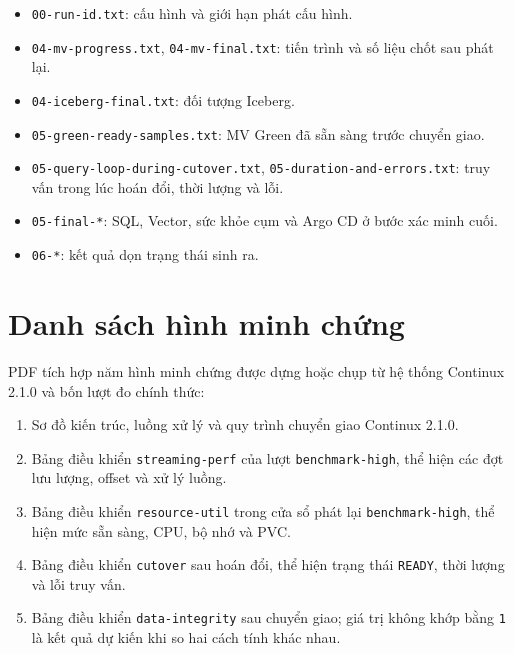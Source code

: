 \begin{itemize}
\item \texttt{00-run-id.txt}: cấu hình và giới hạn phát cấu hình.
\item \texttt{04-mv-progress.txt}, \texttt{04-mv-final.txt}: tiến trình và số liệu chốt sau phát lại.
\item \texttt{04-iceberg-final.txt}: đối tượng Iceberg.
\item \texttt{05-green-ready-samples.txt}: MV Green đã sẵn sàng trước chuyển giao.
\item \texttt{05-query-loop-during-cutover.txt}, \texttt{05-duration-and-errors.txt}: truy vấn trong lúc hoán đổi, thời lượng và lỗi.
\item \texttt{05-final-*}: SQL, Vector, sức khỏe cụm và Argo CD ở bước xác minh cuối.
\item \texttt{06-*}: kết quả dọn trạng thái sinh ra.
\end{itemize}

\section{Danh sách hình minh chứng}\label{app:figures}
PDF tích hợp năm hình minh chứng được dựng hoặc chụp từ hệ thống Continux 2.1.0 và bốn lượt đo chính thức:

\begin{enumerate}
\item Sơ đồ kiến trúc, luồng xử lý và quy trình chuyển giao Continux 2.1.0.
\item Bảng điều khiển \texttt{streaming-perf} của lượt \texttt{benchmark-high}, thể hiện các đợt lưu lượng, offset và xử lý luồng.
\item Bảng điều khiển \texttt{resource-util} trong cửa sổ phát lại \texttt{benchmark-high}, thể hiện mức sẵn sàng, CPU, bộ nhớ và PVC.
\item Bảng điều khiển \texttt{cutover} sau hoán đổi, thể hiện trạng thái \texttt{READY}, thời lượng và lỗi truy vấn.
\item Bảng điều khiển \texttt{data-integrity} sau chuyển giao; giá trị không khớp bằng \texttt{1} là kết quả dự kiến khi so hai cách tính khác nhau.
\end{enumerate}
